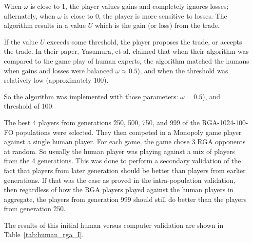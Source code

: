 When \(\omega\) is close to 1, the player values gains and completely ignores
losses; alternately, when \(\omega\) is close to 0, the player is more sensitive
to losses. The algorithm results in a value \(U\) which is the gain (or loss)
from the trade.

If the value \(U\) exceeds some threshold, the player proposes the trade, or
accepts the trade. In their paper, Yasumura, et al, claimed that when their
algorithm was compared to the game play of human experts, the algorithm matched
the humans when gains and losses were balanced \(\omega \approx 0.5\)), and when
the threshold was relatively low (approximately 100).

So the algorithm was implemented with those parameters: \(\omega = 0.5\)), and 
threshold of 100.

The best 4 players from generations 250, 500, 750, and 999 of the 
RGA-1024-100-FO populations were selected. They then competed in a Monopoly game
player against a single human player. For each game, the game chose 3 RGA 
opponents at random. So usually the human player was playing against a mix of
players from the 4 generations. This was done to perform a secondary validation
of the fact that players from later generation should be better than players
from earlier generations. If that was the case as proved in the intra-population
validation, then regardless of how the RGA players played against the human 
players in aggregate, the players from generation 999 should still do better 
than the players from generation 250.

The results of this initial human versus computer validation are shown in 
Table~\ref{tab:human_rga_I}.

